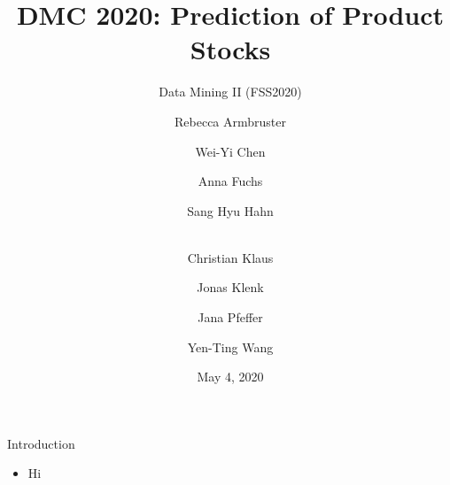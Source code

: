 \documentclass[10pt, xcolor=dvipsnames]{beamer}
\title{\large DMC 2020: Prediction of Product Stocks}
\subtitle{\normalsize Data Mining II (FSS2020)}
\author{\scriptsize Rebecca Armbruster \and
	Wei-Yi Chen \and
	Anna Fuchs \and Sang Hyu Hahn
	\and \\Christian Klaus
	\and Jonas Klenk
	\and Jana Pfeffer
	\and Yen-Ting Wang}
\institute{Team abraca-data}
\date{\small{May 4, 2020}}
\begin{document}
	
\setlength\tabcolsep{1.5pt}
\maketitle
\begin{frame}{Introduction}
        \begin{itemize}
	\item \alert{Hi} 
        \end{itemize}
\end{frame}
\end{document}
